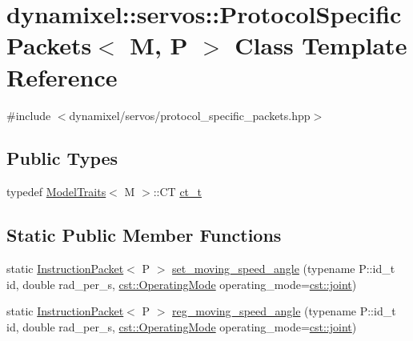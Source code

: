\hypertarget{classdynamixel_1_1servos_1_1_protocol_specific_packets}{}\section{dynamixel\+:\+:servos\+:\+:Protocol\+Specific\+Packets$<$ M, P $>$ Class Template Reference}
\label{classdynamixel_1_1servos_1_1_protocol_specific_packets}


{\ttfamily \#include $<$dynamixel/servos/protocol\+\_\+specific\+\_\+packets.\+hpp$>$}

\subsection*{Public Types}
\begin{DoxyCompactItemize}
\item 
typedef \hyperlink{structdynamixel_1_1servos_1_1_model_traits}{Model\+Traits}$<$ M $>$\+::C\+T \hyperlink{classdynamixel_1_1servos_1_1_protocol_specific_packets_a908d795bf5c78a638ed18616f38baf51}{ct\+\_\+t}
\end{DoxyCompactItemize}
\subsection*{Static Public Member Functions}
\begin{DoxyCompactItemize}
\item 
static \hyperlink{classdynamixel_1_1_instruction_packet}{Instruction\+Packet}$<$ P $>$ \hyperlink{classdynamixel_1_1servos_1_1_protocol_specific_packets_a46e78c8b23086c2388b22209f6539dab}{set\+\_\+moving\+\_\+speed\+\_\+angle} (typename P\+::id\+\_\+t id, double rad\+\_\+per\+\_\+s, \hyperlink{namespacedynamixel_1_1servos_1_1cst_ac17b5608f65c6495114d34f8efc4d809}{cst\+::\+Operating\+Mode} operating\+\_\+mode=\hyperlink{namespacedynamixel_1_1servos_1_1cst_ac17b5608f65c6495114d34f8efc4d809a1fdfcfad31f04d24b25c0842e9d99c48}{cst\+::joint})
\item 
static \hyperlink{classdynamixel_1_1_instruction_packet}{Instruction\+Packet}$<$ P $>$ \hyperlink{classdynamixel_1_1servos_1_1_protocol_specific_packets_a92127d3d5f0a6a257bf076266d7f8389}{reg\+\_\+moving\+\_\+speed\+\_\+angle} (typename P\+::id\+\_\+t id, double rad\+\_\+per\+\_\+s, \hyperlink{namespacedynamixel_1_1servos_1_1cst_ac17b5608f65c6495114d34f8efc4d809}{cst\+::\+Operating\+Mode} operating\+\_\+mode=\hyperlink{namespacedynamixel_1_1servos_1_1cst_ac17b5608f65c6495114d34f8efc4d809a1fdfcfad31f04d24b25c0842e9d99c48}{cst\+::joint})
\end{DoxyCompactItemize}


